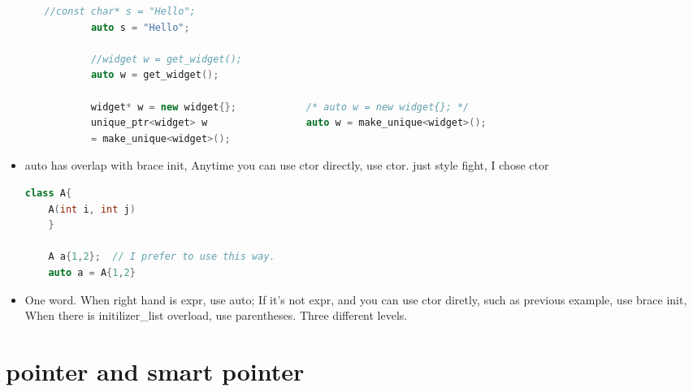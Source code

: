 \documentclass[a4paper,12pt,twoside]{book}
\begin{document}
\begin{itemize}
\begin{enumerate}
		\begin{lstlisting}[frame=single, language=c++]
		//const char* s = "Hello";             
		auto s = "Hello";
		
		//widget w = get_widget();             
		auto w = get_widget();
		
		widget* w = new widget{};            /* auto w = new widget{}; */
		unique_ptr<widget> w                 auto w = make_unique<widget>();
		= make_unique<widget>();
		\end{lstlisting}
		
	\end{enumerate}
	\item auto has overlap with brace init, Anytime you can use ctor directly, use ctor. just style fight, I chose ctor
	\begin{lstlisting}[frame=single, language=c++]
	class A{
	A(int i, int j)
	}
	
	A a{1,2};  // I prefer to use this way. 
	auto a = A{1,2}
	\end{lstlisting}
	
	\item One word. When right hand is expr, use auto; If it's not expr, and you can use ctor diretly, such as previous example, use brace init, When there is initilizer\_list overload, use parentheses. Three different levels.
\end{itemize}


\section{pointer and smart pointer}
\end{document}
